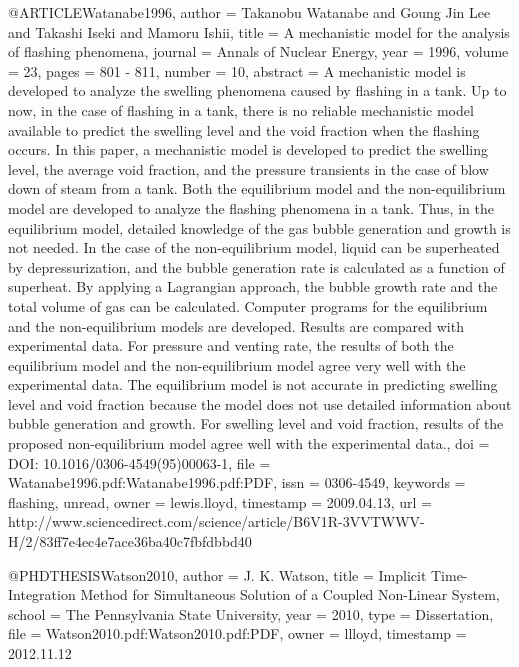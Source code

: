 {{@ARTICLE{Watanabe1996,
  author = {Takanobu Watanabe and Goung Jin Lee and Takashi Iseki and Mamoru
	Ishii},
  title = {A mechanistic model for the analysis of flashing phenomena},
  journal = {Annals of Nuclear Energy},
  year = {1996},
  volume = {23},
  pages = {801 - 811},
  number = {10},
  abstract = {A mechanistic model is developed to analyze the swelling phenomena
	caused by flashing in a tank. Up to now, in the case of flashing
	in a tank, there is no reliable mechanistic model available to predict
	the swelling level and the void fraction when the flashing occurs.
	In this paper, a mechanistic model is developed to predict the swelling
	level, the average void fraction, and the pressure transients in
	the case of blow down of steam from a tank. Both the equilibrium
	model and the non-equilibrium model are developed to analyze the
	flashing phenomena in a tank. Thus, in the equilibrium model, detailed
	knowledge of the gas bubble generation and growth is not needed.
	In the case of the non-equilibrium model, liquid can be superheated
	by depressurization, and the bubble generation rate is calculated
	as a function of superheat. By applying a Lagrangian approach, the
	bubble growth rate and the total volume of gas can be calculated.
	Computer programs for the equilibrium and the non-equilibrium models
	are developed. Results are compared with experimental data. For pressure
	and venting rate, the results of both the equilibrium model and the
	non-equilibrium model agree very well with the experimental data.
	The equilibrium model is not accurate in predicting swelling level
	and void fraction because the model does not use detailed information
	about bubble generation and growth. For swelling level and void fraction,
	results of the proposed non-equilibrium model agree well with the
	experimental data.},
  doi = {DOI: 10.1016/0306-4549(95)00063-1},
  file = {Watanabe1996.pdf:Watanabe1996.pdf:PDF},
  issn = {0306-4549},
  keywords = {flashing, unread},
  owner = {lewis.lloyd},
  timestamp = {2009.04.13},
  url = {http://www.sciencedirect.com/science/article/B6V1R-3VVTWWV-H/2/83ff7e4ec4e7ace36ba40c7fbfdbbd40}
}

@PHDTHESIS{Watson2010,
  author = {J. K. Watson},
  title = {Implicit Time-Integration Method for Simultaneous Solution of a Coupled
	Non-Linear System},
  school = {The Pennsylvania State University},
  year = {2010},
  type = {Dissertation},
  file = {Watson2010.pdf:Watson2010.pdf:PDF},
  owner = {llloyd},
  timestamp = {2012.11.12}
}

}}
